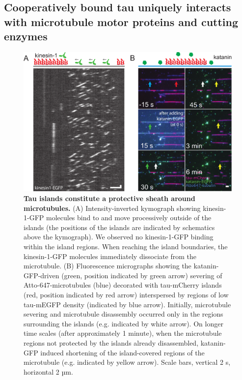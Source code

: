 \subsection{Cooperatively bound tau uniquely interacts with microtubule motor proteins and cutting enzymes}
\begin{figure}[h!]
\centering
\includegraphics[scale=0.85]{Figures/tau3.png}
\caption[Tau islands constitute a protective sheath around microtubules.]{
\textbf{Tau islands constitute a protective sheath around microtubules.} (A) Intensity-inverted kymograph showing kinesin-1-GFP molecules bind to and move processively outside of the islands (the positions of the islands are indicated by schematics above the kymograph). We observed no kinesin-1-GFP binding within the island regions. When reaching the island boundaries, the kinesin-1-GFP molecules immediately dissociate from the microtubule. (B) Fluorescence micrographs showing the katanin-GFP-driven (green, position indicated by green arrow) severing of Atto-647-microtubules (blue) decorated with tau-mCherry islands (red, position indicated by red arrow) interspersed by regions of low tau-mEGFP density (indicated by blue arrow). Initially, microtubule severing and microtubule disassembly occurred only in the regions surrounding the islands (e.g. indicated by white arrow). On longer time scales (after approximately 1 minute), when the microtubule regions not protected by the islands already disassembled, katanin-GFP induced shortening of the island-covered regions of the microtubule (e.g. indicated by yellow arrow). Scale bars, vertical 2 s, horizontal 2 µm.   
	}\label{tau3}
\end{figure}
